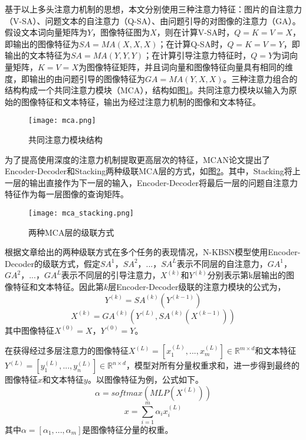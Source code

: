基于以上多头注意力机制的思想，本文分别使用三种注意力特征：图片的自注意力（V-SA）、问题文本的自注意力（Q-SA）、由问题引导的对图像的注意力（GA）。假设文本词向量矩阵为$Y$，图像特征图为$X$，则在计算V-SA时，$Q = K = V = X$，即输出的图像特征为$SA=MA(X, X, X)$；在计算Q-SA时，$Q = K = V = Y$，即输出的文本特征为$SA=MA(Y, Y, Y)$；在计算引导注意力特征时，$Q = Y$为词向量矩阵，$K = V = X$为图像特征矩阵，并且词向量和图像特征向量具有相同的维度，即输出的由问题引导的图像特征为$GA=MA(Y, X, X)$。三种注意力组合的结构构成一个共同注意力模块（MCA），结构如图\ref{mca}。共同注意力模块以输入为原始的图像特征和文本特征，输出为经过注意力机制的图像和文本特征。
\begin{figure}[H]
	\texttt{[image: mca.png]}
	\caption{共同注意力模块结构}
	\label{mca}
\end{figure}

为了提高使用深度的注意力机制提取更高层次的特征，MCAN论文提出了Encoder-Decoder和Stacking两种级联MCA层的方式，如图\ref{mca_stacking}。其中，Stacking将上一层的输出直接作为下一层的输入，Encoder-Decoder将最后一层的问题自注意力特征作为每一层图像的查询矩阵。
\begin{figure}[H]
	\texttt{[image: mca\_stacking.png]}
	\caption{两种MCA层的级联方式}
	\label{mca_stacking}
\end{figure}

根据文章给出的两种级联方式在多个任务的表现情况，N-KBSN模型使用Encoder-Decoder的级联方式，假定$SA^1$，$SA^2$，...，$SA^L$表示不同层的自注意力，$GA^1$，$GA^2$，...，$GA^L$表示不同层的引导注意力，$X^{(k)}$和$Y^{(k)}$分别表示第k层输出的图像特征和文本特征。因此第$k$层Encoder-Decoder级联的注意力模块的公式为，
\begin{equation}
Y^{(k)} = SA^{(k)}(Y^{(k-1)})
\end{equation}
\begin{equation}
X^{(k)} = GA^{(k)}(Y^{(L)}, SA^{(k)}(X^{(k-1)}))
\end{equation}
其中图像特征$X^{(0)}=X$，$Y^{(0)}=Y$。

在获得经过多层注意力的图像特征$X^{(L)}=[x^{(L)}_1,...,x^{(L)}_m]\in\mathbb{R}^{m \times d}$和文本特征$Y^{(L)}=[y^{(L)}_1,...,y^{(L)}_n]\in\mathbb{R}^{n \times d}$，模型对所有分量权重求和，进一步得到最终的图像特征$x$和文本特征$y$。以图像特征为例，公式如下。
\begin{equation}
\alpha = softmax(MLP(X^{(L)}))
\end{equation}
\begin{equation}
x = \sum_{i=1}^m \alpha_i x_i^{(L)}
\end{equation}
其中$\alpha = [\alpha_1,...,\alpha_m]$是图像特征分量的权重。

